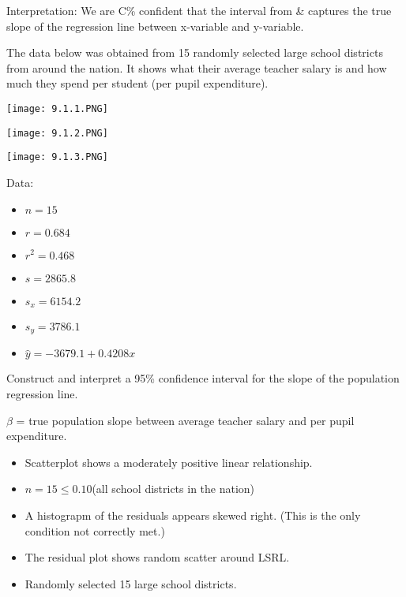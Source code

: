 \documentclass[../stats.tex]{subfiles}
\begin{document}
Interpretation: We are C\% confident that the interval from \blank \& \blank captures the true slope of the regression line between {x-variable} and {y-variable}.

\begin{example}
    The data below was obtained from 15 randomly selected large school districts from around the nation. It shows what their average teacher salary is and how much they spend per student (per pupil expenditure).
    \begin{center}
        \texttt{[image: 9.1.1.PNG]}
    \end{center}
    \begin{center}
        \texttt{[image: 9.1.2.PNG]}
    \end{center}
    \begin{center}
        \texttt{[image: 9.1.3.PNG]}
    \end{center}

    Data:
    \begin{itemize}
        \item $n=15$
        \item $r=0.684$
        \item $r^2=0.468$
        \item $s=2865.8$
        \item $s_x=6154.2$
        \item $s_y=3786.1$
        \item $\hat{y}=-3679.1+0.4208x$
    \end{itemize}

    Construct and interpret a 95\% confidence interval for the slope of the population regression line.

    $\beta$ = true population slope between average teacher salary and per pupil expenditure.
    
    \begin{itemize}
        \item Scatterplot shows a moderately positive linear relationship.
        \item $n=15\leq 0.10$(all school districts in the nation)
        \item A histograpm of the residuals appears skewed right. (This is the only condition not correctly met.)
        \item The residual plot shows random scatter around LSRL.
        \item Randomly selected 15 large school districts.
    \end{itemize}


\end{example}
\end{document}
